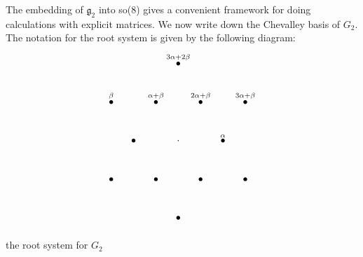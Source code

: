 \documentclass[12pt,letterpaper]{amsart}
\begin{document}
The embedding of ${\mathfrak g}_2$ into so(8) gives a convenient framework
for doing calculations with explicit matrices. We now write down
the Chevalley basis of $G_2$. The notation for the root system is given
by the following diagram:
\[
\begin{tikzpicture}[x=1.6cm,y=1.6cm]
\foreach \p/\l in {{(0,1.732)}/{3\alpha+2\beta}, {(-1.5,0.866)}/{\beta},
  {(-0.5,0.866)}/{\alpha+\beta}, {(0.5,0.866)}/{2\alpha+\beta},
  {(1.5,0.866)}/{3\alpha+\beta}, {(1,0)}/{\alpha}}
  {\node at \p {$\bullet$}; \node[above] at \p {$\scriptstyle \l$};}
\foreach \p in {(-1,0),(-1.5,-0.866),(-0.5,-0.866),(0.5,-0.866),(1.5,-0.866),(0,-1.732)}
  {\node at \p {$\bullet$};}
\node at (0,0) {$\cdot$};
\end{tikzpicture}
\]
\centerline{the root system for $G_2$}
\end{document}
